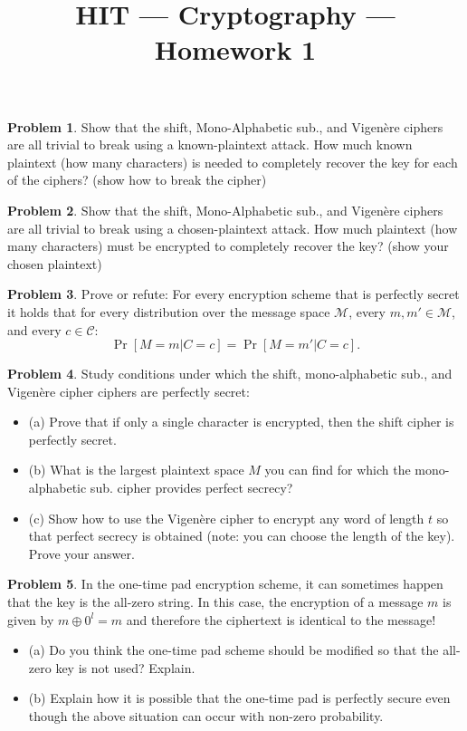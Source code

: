 \documentclass[11pt]{article}
\title{HIT --- Cryptography --- Homework 1}
\theoremstyle{definition}
\newtheorem{problem}{Problem}
\begin{document}
\maketitle

\begin{problem}
Show that the shift, Mono-Alphabetic sub., and Vigen\`{e}re ciphers are all trivial to break using a known-plaintext attack. How much known plaintext (how many characters) is needed to completely recover the key for each of the ciphers?  (show how to break the cipher)
\end{problem}

\begin{problem}
Show that the shift, Mono-Alphabetic sub., and Vigen\`{e}re ciphers are all trivial to break using a chosen-plaintext attack. How much plaintext (how many characters) must be encrypted to completely recover the key? (show your chosen plaintext) 
\end{problem}

\begin{problem}
Prove or refute: For every encryption scheme that is perfectly secret it holds that for every distribution over the message space $\mathcal{M}$, every $m, m' \in \mathcal{M}$, and every $c \in \mathcal{C}$:
\[ \Pr[M=m | C=c] = \Pr[M=m'|C=c].
\]
\end{problem}

\begin{problem}
Study conditions under which the shift, mono-alphabetic sub., and Vigen\`{e}re cipher ciphers are perfectly secret:
\begin{itemize}
\item (a) Prove that if only a single character is encrypted, then the shift cipher is perfectly secret.
\item (b) What is the largest plaintext space $M$ you can find for which the mono-alphabetic sub. cipher provides perfect secrecy?
\item (c) Show how to use the Vigen\`{e}re cipher to encrypt any word of length $t$ so that perfect secrecy is obtained (note: you can choose the length of the key). Prove your answer.
\end{itemize}
\end{problem}

\begin{problem}
In the one-time pad encryption scheme, it can sometimes happen that the key is the all-zero string. In this case, the encryption of a message $m$ is given by $m \oplus 0^{l} = m$ and therefore the ciphertext is identical to the message!
\begin{itemize}
\item (a) Do you think the one-time pad scheme should be modified so that the all-zero key is not used? Explain.
\item (b) Explain how it is possible that the one-time pad is perfectly secure even though the above situation can occur with non-zero probability.
\end{itemize}
\end{problem}
\end{document}
